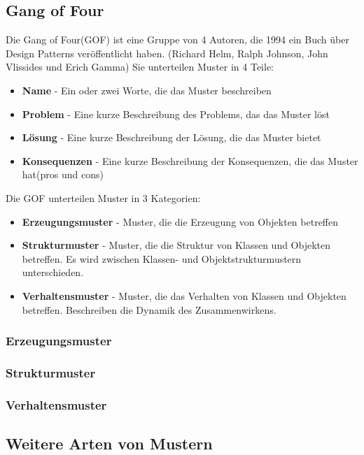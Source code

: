 \documentclass[12pt]{scrartcl}
\begin{document}
\subsection{Gang of Four}

Die Gang of Four(GOF) ist eine Gruppe von 4 Autoren, die 1994 ein Buch über Design Patterns veröffentlicht haben.
(Richard Helm, Ralph Johnson, John Vlissides und Erich Gamma) Sie unterteilen Muster in 4 Teile:
\begin{itemize}
	\item \textbf{Name} - Ein oder zwei Worte, die das Muster beschreiben
	\item \textbf{Problem} - Eine kurze Beschreibung des Problems, das das Muster löst
	\item \textbf{Lösung} - Eine kurze Beschreibung der Lösung, die das Muster bietet
	\item \textbf{Konsequenzen} - Eine kurze Beschreibung der Konsequenzen, die das Muster hat(pros und cons)
\end{itemize}

Die GOF unterteilen Muster in 3 Kategorien:
\begin{itemize}
	\item \textbf{Erzeugungsmuster} - Muster, die die Erzeugung von Objekten betreffen
	\item \textbf{Strukturmuster} - Muster, die die Struktur von Klassen und Objekten betreffen. Es wird zwischen Klassen- und Objektstrukturmustern unterschieden.
	\item \textbf{Verhaltensmuster} - Muster, die das Verhalten von Klassen und Objekten betreffen. Beschreiben die Dynamik des Zusammenwirkens.
\end{itemize}

\subsubsection{Erzeugungsmuster}
\subsubsection{Strukturmuster}
\subsubsection{Verhaltensmuster}

\subsection{Weitere Arten von Mustern}
\end{document}
